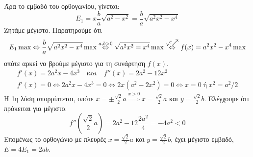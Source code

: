\documentclass[a4paper,table]{report}
\begin{document}
\begin{solution}
    Άρα το εμβαδό του ορθογωνίου, γίνεται:
    \[
      E_{1}=x  \frac{b}{a} \sqrt{ a^{2}-x^{2}} = \frac{b}{a} \sqrt{a^{2}x^{2}-x^{4}}
    \]
  Ζητάμε μέγιστο. Παρατηρούμε ότι 
  \[ 
    E_{1} \max \Leftrightarrow
    \frac{b}{a} \sqrt{a^{2}x^{2}-x^{4}} \max \overset{a,b>0}{\Leftrightarrow}
    \sqrt{a^{2}x^{2}=x^{4}} \max
    \overset{\sqrt{\cdot}\raisebox{1pt}{$\nearrow$}}{\Leftrightarrow} 
    f(x)=a^{2}x^{2}-x^{4} \max 
  \] 
  οπότε αρκεί να βρούμε μέγιστο για τη συνάρτηση $ f(x) $.
  \begin{gather*}
    f'(x)=2a^{2}x-4x^{3} \quad \text{και} \quad f''(x)=2a^{2}-12x^{2} \\
    f'(x)=0 \Leftrightarrow 2a^{2}x-4x^{3}=0 \Leftrightarrow 2x(a^{2}-2x^{2})=0
    \Leftrightarrow x = 0 \; \text{ή} \; x^{2}= a^{2}/2
  \end{gather*} 
  Η 1η λύση απορρίπτεται, οπότε $ x= \pm \frac{\sqrt{2}}{2} a \overset{x>0}{\Rightarrow}
  x = \frac{\sqrt{2}}{2} a $ και $ y= \frac{\sqrt{2}}{2} b $. Ελέγχουμε ότι πρόκειται 
  για μέγιστο.
  \[
    f''\left(\frac{\sqrt{2}}{2} a\right) = 2a^{2}-12 \frac{2a^{2}}{4} = - 4a^{2}<0
  \] 
  Επομένως το ορθογώνιο με πλευρές $ x= \frac{\sqrt{2}}{2} a $ και $ y =
  \frac{\sqrt{2}}{2} b $, έχει μέγιστο εμβαδό, $ E=4E_{1} = 2ab $.
\end{solution}
\end{document}
